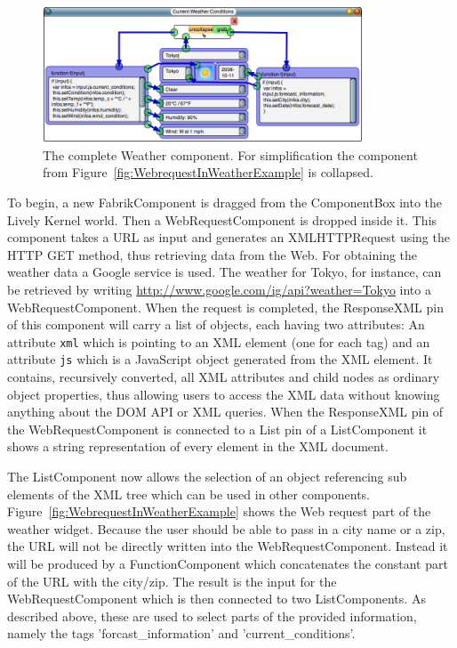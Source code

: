 \documentclass[pdftex, times, 10pt, twocolumn]{article}
\begin{document}
\begin{figure}[]\centering
\includegraphics[width=0.850000\textwidth]{weatherExample07.png} 

\caption{The complete Weather component. For simplification the component from Figure~\ref{fig:WebrequestInWeatherExample} is collapsed. }
\label{fig:ExapandedSimplifiedWeatherExample}
\end{figure}
To begin, a new FabrikComponent is dragged from the ComponentBox into the Lively Kernel world. Then a WebRequestComponent is dropped inside it. This component takes a URL as input and generates an XMLHTTPRequest using the HTTP GET method, thus retrieving data from the Web. For obtaining the weather data a Google service is used. The weather for Tokyo, for instance, can be retrieved by writing \url{http://www.google.com/ig/api?weather=Tokyo} into a WebRequestComponent. When the request is completed, the ResponseXML pin of this component will carry a list of objects, each having two attributes: An attribute {\tt xml} which is pointing to an XML element (one for each tag) and an attribute {\tt js} which is a JavaScript object generated from the XML element. It contains, recursively converted, all XML attributes and child nodes as ordinary object properties, thus allowing users to access the XML data without knowing anything about the DOM API or XML queries. When the ResponseXML pin of the WebRequestComponent is connected to a List pin of a ListComponent it shows a string representation of every element in the XML document. 

The ListComponent now allows the selection of an object referencing sub elements of the XML tree which can be used in other components. Figure~\ref{fig:WebrequestInWeatherExample} shows the Web request part of the weather widget. Because the user should be able to pass in a city name or a zip, the URL will not be directly written into the WebRequestComponent. Instead it will be produced by a FunctionComponent which concatenates the constant part of the URL with the city/zip. The result is the input for the WebRequestComponent which is then connected to two ListComponents. As described above, these are used to select parts of the provided information, namely the tags 'forcast\_information' and 'current\_conditions'. 
\end{document}
